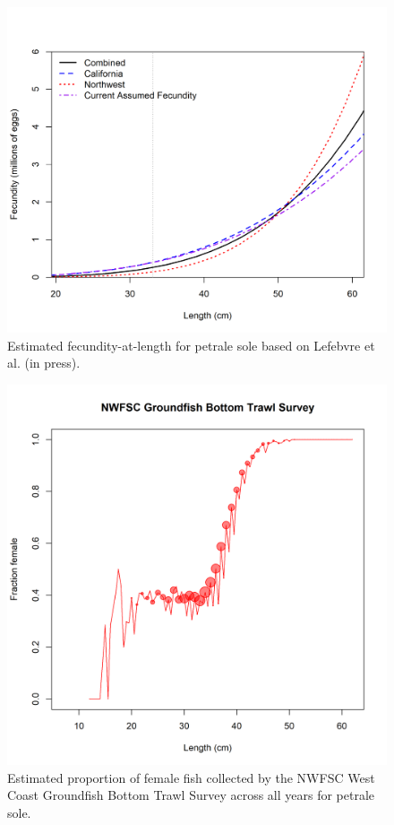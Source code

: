 \documentclass[12pt,]{article}
\begin{document}
\FloatBarrier

\begin{figure}
\centering
\includegraphics{Figures/fecundity.png}
\caption{Estimated fecundity-at-length for petrale sole based on
Lefebvre et al. (in press). \label{fig:fecundity}}
\end{figure}

\FloatBarrier

\begin{figure}
\centering
\includegraphics{Figures/NWFSC Groundfish Bottom Trawl Survey_length_fraction_female.png}
\caption{Estimated proportion of female fish collected by the NWFSC West
Coast Groundfish Bottom Trawl Survey across all years for petrale sole.
\label{fig:sex_ratio}}
\end{figure}
\end{document}

